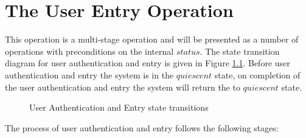 
\chapter{The User Entry Operation}
\label{sec:UserEntry}

\label{sec:userEntry}
This operation is a multi-stage operation and will be presented as 
a number of operations with preconditions on the internal $status$.
The state transition diagram for user authentication and entry is
given in Figure \ref{fig:userEntry}. Before user authentication and
entry the system is in the $quiescent$ state, on completion of the
user authentication and entry the system will return the to
$quiescent$ state.

\begin{figure}[htbp]
  \begin{center}
    \leavevmode
    \caption{User Authentication and Entry state transitions}
    \label{fig:userEntry}
  \end{center}
\end{figure}

The process of user authentication and entry follows the following
stages:

